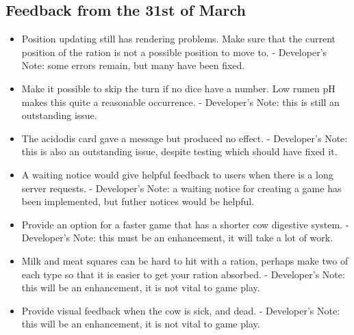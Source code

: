 \subsection{Feedback from the 31st of March}
\begin{itemize}
	\item Position updating still has rendering problems. Make sure that the current position of the ration is not a possible position to move to. - Developer's Note: some errors remain, but many have been fixed.
	\item Make it possible to skip the turn if no dice have a number. Low rumen pH makes this quite a reasonable occurrence. - Developer's Note: this is still an outstanding issue.
	\item The acidodis card gave a message but produced no effect. - Developer's Note: this is also an outstanding issue, despite testing which should have fixed it.
	\item A waiting notice would give helpful feedback to users when there is a long server requests. - Developer's Note: a waiting notice for creating a game has been implemented, but futher notices would be helpful.
	\item Provide an option for a faster game that has a shorter cow digestive system. - Developer's Note: this must be an enhancement, it will take a lot of work.
	\item Milk and meat squares can be hard to hit with a ration, perhaps make two of each type so that it is easier to get your ration absorbed. - Developer's Note: this will be an enhancement, it is not vital to game play.
	\item Provide visual feedback when the cow is sick, and dead. - Developer's Note: this will be an enhancement, it is not vital to game play.
\end{itemize}

